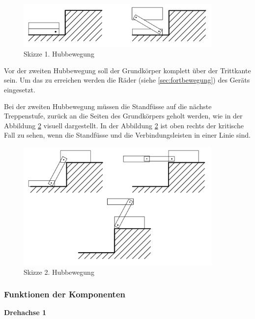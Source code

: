 \begin{figure}[H]
  \includegraphics[width=0.9\textwidth]{img/Treppensteigen/1. Hubbewegung Skizze.png}
  \centering
  \caption{Skizze 1. Hubbewegung}
  \label{fig:1-hubbewegung}
\end{figure}
 
Vor der zweiten Hubbewegung soll der Grundkörper komplett über der Trittkante sein. Um das zu erreichen werden die Räder (siehe \ref{sec:fortbewegung}) des Geräts eingesetzt.
 
Bei der zweiten Hubbewegung müssen die Standfüsse auf die nächste Treppenstufe, zurück an die Seiten des Grundkörpers geholt werden, wie in der Abbildung \ref{fig:2-hubbewegung} visuell dargestellt. In der Abbildung \ref{fig:2-hubbewegung} ist oben rechts der kritische Fall zu sehen, wenn die Standfüsse und die Verbindungsleisten in einer Linie sind.

\begin{figure}[H]
  \includegraphics[width=0.9\textwidth]{img/Treppensteigen/2. Hubbewegung Skizze.png}
  \centering
  \caption{Skizze 2. Hubbewegung}
  \label{fig:2-hubbewegung}
\end{figure}

\newpage

\subsubsection{Funktionen der Komponenten}
\textbf{Drehachse 1}\\

